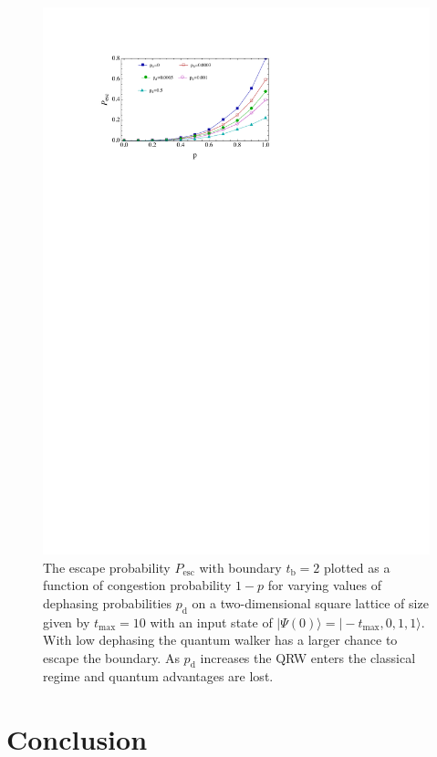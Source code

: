 \documentclass[aps,pra,twocolumn,amsmath,amssymb,nofootinbib,superscriptaddress]{revtex4}
\newcommand{\ket}[1]{|#1\rangle}
\begin{document}
\begin{figure}[]
\includegraphics[scale=0.5]{PescPPd.pdf}
\caption{\label{fig:PescPPd} The escape probability $P_{\mathrm{esc}}$ with boundary $t_\mathrm{b}=2$ plotted as a function of congestion probability $1-p$ for varying values of dephasing probabilities $p_{\mathrm{d}}$ on a two-dimensional square lattice of size given by $t_\mathrm{max}=10$ with an input state of $\ket{\Psi(0)}=\ket{-t_\mathrm{max},0,1,1}$. With low dephasing the quantum walker has a larger chance to escape the boundary. As $p_{\mathrm{d}}$ increases the QRW enters the classical regime and quantum advantages are lost.}
\end{figure}

\section{Conclusion}
\end{document}
